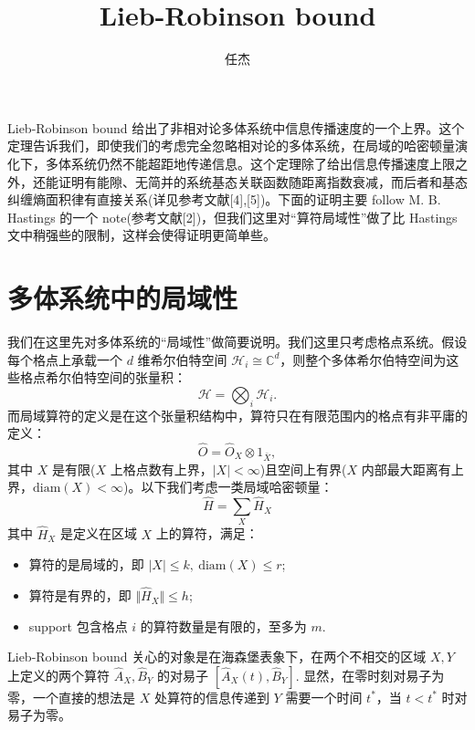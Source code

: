 \documentclass[10pt,UTF8]{ctexart}
\begin{document}
\title{Lieb-Robinson bound}
\author{任杰}
\date{}

\maketitle

Lieb-Robinson bound 给出了非相对论多体系统中信息传播速度的一个上界。这个定理告诉我们，即使我们的考虑完全忽略相对论的多体系统，在局域的哈密顿量演化下，多体系统仍然不能超距地传递信息。这个定理除了给出信息传播速度上限之外，还能证明有能隙、无简并的系统基态关联函数随距离指数衰减，而后者和基态纠缠熵面积律有直接关系(详见参考文献[4],[5])。下面的证明主要 follow M. B. Hastings 的一个 note(参考文献[2])，但我们这里对“算符局域性”做了比 Hastings 文中稍强些的限制，这样会使得证明更简单些。

\section*{多体系统中的局域性}
\noindent
我们在这里先对多体系统的“局域性”做简要说明。我们这里只考虑格点系统。假设每个格点上承载一个 $d$ 维希尔伯特空间 $\mathcal H_i \cong \mathbb{C}^d$，则整个多体希尔伯特空间为这些格点希尔伯特空间的张量积：
\begin{equation}
	\mathcal H = \bigotimes_{i} \mathcal{H}_i.
\end{equation}
而局域算符的定义是在这个张量积结构中，算符只在有限范围内的格点有非平庸的定义：
\begin{equation}
	\hat O = \hat{O}_X \otimes 1_{\bar X},
\end{equation}
其中 $X$ 是有限($X$ 上格点数有上界，$|X|<\infty$)且空间上有界($X$ 内部最大距离有上界，$\mathrm{diam}(X)<\infty$)。以下我们考虑一类局域哈密顿量：
\begin{equation}
	\hat H = \sum_X \hat H_{X}
\end{equation}
其中 $\hat H_X$ 是定义在区域 $X$ 上的算符，满足：
\begin{itemize}
	\item 算符的是局域的，即 $|X| \le k,\ \mathrm{diam}(X) \le r$;
	\item 算符是有界的，即 $\Vert \hat H_X \Vert \le h$;
	\item support 包含格点 $i$ 的算符数量是有限的，至多为 $m$.
\end{itemize}
Lieb-Robinson bound 关心的对象是在海森堡表象下，在两个不相交的区域 $X,Y$ 上定义的两个算符 $\hat{A}_X,\hat{B}_Y$ 的对易子 $[\hat A_X(t),\hat B_Y]$. 显然，在零时刻对易子为零，一个直接的想法是 $X$ 处算符的信息传递到 $Y$ 需要一个时间 $t^*$，当 $t<t^*$ 时对易子为零。
\end{document}
